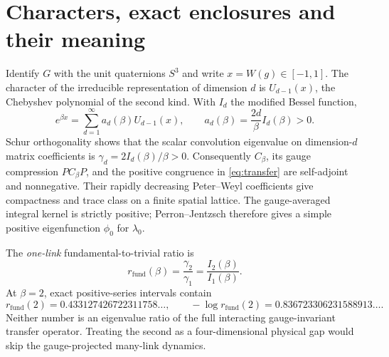 \documentclass[11pt,a4paper]{article}
\numberwithin{equation}{section}
\begin{document}
\section{Characters, exact enclosures and their meaning}
\label{sec:characters}

Identify \(G\) with the unit quaternions \(S^3\) and write
\(x=W(g)\in[-1,1]\). The character of the irreducible representation
of dimension \(d\) is \(U_{d-1}(x)\), the Chebyshev polynomial of the
second kind. With \(I_d\) the modified Bessel function,
\begin{equation}
 e^{\beta x}=\sum_{d=1}^{\infty}
        a_d(\beta)U_{d-1}(x),\qquad
 a_d(\beta)=\frac{2d}{\beta}I_d(\beta)>0.
                                                        \label{eq:chars}
\end{equation}
Schur orthogonality shows that the scalar convolution
eigenvalue on dimension-\(d\) matrix coefficients is
\(\gamma_d=2I_d(\beta)/\beta>0\).
Consequently \(C_\beta\), its gauge compression \(PC_\beta P\),
and the positive congruence in \eqref{eq:transfer} are
self-adjoint and nonnegative. Their rapidly decreasing
Peter--Weyl coefficients give compactness and trace class on a
finite spatial lattice. The gauge-averaged integral kernel is
strictly positive; Perron--Jentzsch therefore gives a simple
positive eigenfunction \(\phi_0\) for \(\lambda_0\).

The \emph{one-link} fundamental-to-trivial ratio is
\begin{equation}
 r_{\mathrm{fund}}(\beta)
   =\frac{\gamma_2}{\gamma_1}
   =\frac{I_2(\beta)}{I_1(\beta)}.                 \label{eq:besselratio}
\end{equation}
At \(\beta=2\), exact positive-series intervals contain
\begin{equation}
 r_{\mathrm{fund}}(2)
 =0.433127426722311758\ldots,\qquad
 -\log r_{\mathrm{fund}}(2)
 =0.836723306231588913\ldots.                   \label{eq:besselvalue}
\end{equation}
Neither number is an eigenvalue ratio of the full interacting
gauge-invariant transfer operator. Treating the second as a
four-dimensional physical gap would skip the gauge-projected
many-link dynamics.
\end{document}
